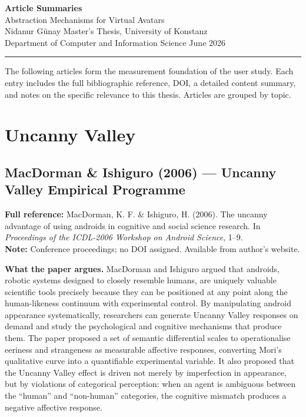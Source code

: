 \documentclass[11pt, a4paper]{article}
\begin{document}
\begin{center}
  {\LARGE\sffamily\bfseries\color{konstanzblue} Article Summaries}\\[6pt]
  {\large\sffamily Abstraction Mechanisms for Virtual Avatars}\\[10pt]
  {\normalsize Nidanur G\"{u}nay \quad Master's Thesis, University of Konstanz}\\
  {\normalsize Department of Computer and Information Science \quad June 2026}
\end{center}
\vspace{6pt}
\noindent\color{konstanzblue}\rule{\linewidth}{1pt}
\vspace{8pt}

The following articles form the measurement foundation of the user study. Each entry includes the full bibliographic reference, DOI, a detailed content summary, and notes on the specific relevance to this thesis. Articles are grouped by topic.

\tableofcontents
\newpage

\section{Uncanny Valley}

\subsection{MacDorman \& Ishiguro (2006) --- Uncanny Valley Empirical Programme}

\begin{refbox}
\textbf{Full reference:} MacDorman, K. F. \& Ishiguro, H. (2006). The uncanny advantage of using androids in cognitive and social science research. In \textit{Proceedings of the ICDL-2006 Workshop on Android Science}, 1--9.\\[4pt]
\textbf{Note:} Conference proceedings; no DOI assigned. Available from author's website.
\end{refbox}

\textbf{What the paper argues.} MacDorman and Ishiguro argued that androids, robotic systems designed to closely resemble humans, are uniquely valuable scientific tools precisely because they can be positioned at any point along the human-likeness continuum with experimental control. By manipulating android appearance systematically, researchers can generate Uncanny Valley responses on demand and study the psychological and cognitive mechanisms that produce them. The paper proposed a set of semantic differential scales to operationalise eeriness and strangeness as measurable affective responses, converting Mori's qualitative curve into a quantifiable experimental variable. It also proposed that the Uncanny Valley effect is driven not merely by imperfection in appearance, but by violations of categorical perception: when an agent is ambiguous between the ``human'' and ``non-human'' categories, the cognitive mismatch produces a negative affective response.
\end{document}
